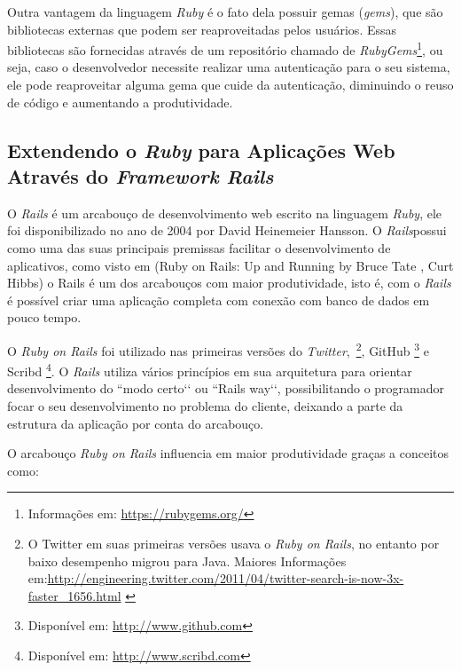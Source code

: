 Outra vantagem da linguagem \textit{Ruby} é o fato dela possuir gemas (\textit{gems}), que são bibliotecas externas que podem ser reaproveitadas pelos usuários. Essas bibliotecas são fornecidas através de um repositório chamado de \textit{RubyGems}\footnote{Informações em: \url{https://rubygems.org/}}, ou seja, caso o desenvolvedor necessite realizar uma autenticação para o seu sistema, ele pode reaproveitar alguma gema que cuide da autenticação, diminuindo o reuso de código e aumentando a produtividade.

\subsection{Extendendo o \textit{Ruby} para Aplicações Web Através do \textit{Framework Rails}}
\label{sub:frameworkrails}

O \textit{Rails} é um arcabouço de desenvolvimento web escrito na linguagem \textit{Ruby}, ele foi disponibilizado no ano de 2004 por David Heinemeier Hansson. O \textit{Rails}possui como uma das suas principais premissas facilitar o desenvolvimento de aplicativos, como visto em (Ruby on Rails: Up and Running by Bruce Tate , Curt Hibbs) o Rails é um dos arcabouços com maior produtividade, isto é, com o \textit{Rails} é possível criar uma aplicação completa com conexão com banco de dados em pouco tempo. 

O \textit{Ruby on Rails} foi utilizado nas primeiras versões do \textit{Twitter},~\footnote{O Twitter em suas primeiras versões usava o \textit{Ruby on Rails}, no entanto por baixo desempenho migrou para Java. Maiores Informações em:\url{http://engineering.twitter.com/2011/04/twitter-search-is-now-3x-faster_1656.html} \label{ft:twitterjava}}, GitHub \footnote{Disponível em: \url{http://www.github.com}} e Scribd \footnote{Disponível em: \url{http://www.scribd.com}}. O \textit{Rails} utiliza vários princípios em sua arquitetura para orientar desenvolvimento do ``modo certo‘‘ ou ``Rails way‘‘, possibilitando o programador focar o seu desenvolvimento no problema do cliente, deixando a parte da estrutura da aplicação por conta do arcabouço. %

O arcabouço \textit{Ruby on Rails} influencia em maior produtividade graças a conceitos como:

